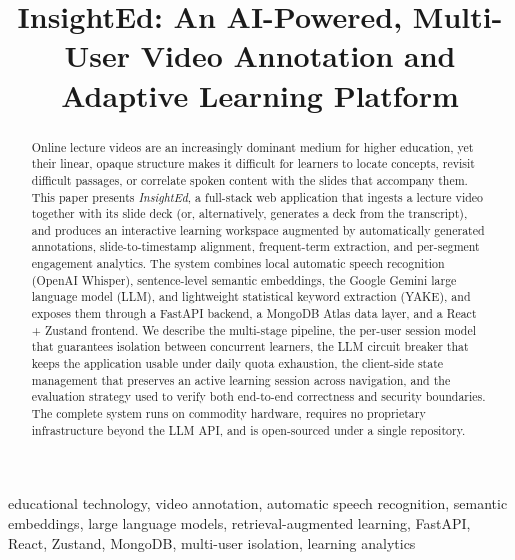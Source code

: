 \documentclass[conference]{IEEEtran}
\begin{document}
\title{InsightEd: An AI-Powered, Multi-User Video Annotation and Adaptive Learning Platform}

\author{
}

\maketitle

\begin{abstract}
Online lecture videos are an increasingly dominant medium for higher education, yet their linear, opaque structure makes it difficult for learners to locate concepts, revisit difficult passages, or correlate spoken content with the slides that accompany them. This paper presents \textit{InsightEd}, a full-stack web application that ingests a lecture video together with its slide deck (or, alternatively, generates a deck from the transcript), and produces an interactive learning workspace augmented by automatically generated annotations, slide-to-timestamp alignment, frequent-term extraction, and per-segment engagement analytics. The system combines local automatic speech recognition (OpenAI Whisper), sentence-level semantic embeddings, the Google Gemini large language model (LLM), and lightweight statistical keyword extraction (YAKE), and exposes them through a FastAPI backend, a MongoDB Atlas data layer, and a React + Zustand frontend. We describe the multi-stage pipeline, the per-user session model that guarantees isolation between concurrent learners, the LLM circuit breaker that keeps the application usable under daily quota exhaustion, the client-side state management that preserves an active learning session across navigation, and the evaluation strategy used to verify both end-to-end correctness and security boundaries. The complete system runs on commodity hardware, requires no proprietary infrastructure beyond the LLM API, and is open-sourced under a single repository.
\end{abstract}

\begin{IEEEkeywords}
educational technology, video annotation, automatic speech recognition, semantic embeddings, large language models, retrieval-augmented learning, FastAPI, React, Zustand, MongoDB, multi-user isolation, learning analytics
\end{IEEEkeywords}
\end{document}
